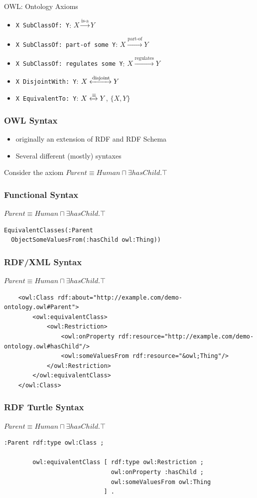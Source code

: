 \documentclass[aspectratio=169]{beamer} %
\begin{document}
\begin{frame}{OWL: Ontology Axioms}
  \begin{itemize}
  \item {\tt X SubClassOf: Y}: $X \xrightarrow{\text{is-a}} Y$
  \item {\tt X SubClassOf: part-of some Y}: $X \xrightarrow{\text{part-of}} Y$
  \item {\tt X SubClassOf: regulates some Y}: $X \xrightarrow{\text{regulates}} Y$
  \item {\tt X DisjointWith: Y}: $X \xleftrightarrow{\text{disjoint}} Y$
  \item {\tt X EquivalentTo: Y}: $X \xleftrightarrow{\equiv} Y$, $\{X,Y\}$
\end{itemize}
\end{frame}

\begin{frame}
  \frametitle{OWL Syntax}
  \begin{itemize}
  \item originally an extension of RDF and RDF Schema
  \item Several different (mostly) syntaxes
  \end{itemize}
  Consider the axiom $Parent \equiv Human \sqcap \exists hasChild.\top$
\end{frame}

\begin{frame}[fragile]
  \frametitle{Functional Syntax}
  $Parent \equiv Human \sqcap \exists hasChild.\top$
\begin{verbatim}
EquivalentClasses(:Parent 
  ObjectSomeValuesFrom(:hasChild owl:Thing))
\end{verbatim}
\end{frame}

\begin{frame}[fragile]
  \frametitle{RDF/XML Syntax}
  $Parent \equiv Human \sqcap \exists hasChild.\top$
{\tiny
\begin{verbatim}
    <owl:Class rdf:about="http://example.com/demo-ontology.owl#Parent">
        <owl:equivalentClass>
            <owl:Restriction>
                <owl:onProperty rdf:resource="http://example.com/demo-ontology.owl#hasChild"/>
                <owl:someValuesFrom rdf:resource="&owl;Thing"/>
            </owl:Restriction>
        </owl:equivalentClass>
    </owl:Class>
\end{verbatim}
}
\end{frame}

\begin{frame}[fragile]
  \frametitle{RDF Turtle Syntax}
  $Parent \equiv Human \sqcap \exists hasChild.\top$
{\tiny
\begin{verbatim}
:Parent rdf:type owl:Class ;
        
        owl:equivalentClass [ rdf:type owl:Restriction ;
                              owl:onProperty :hasChild ;
                              owl:someValuesFrom owl:Thing
                            ] .
\end{verbatim}
}
\end{frame}
\end{document}
